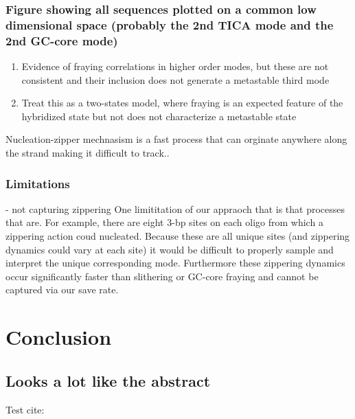 \documentclass[journal=jpcbfk,manuscript=article]{achemso}
\begin{document}
\subsubsection{\label{sec:Results}Figure showing all sequences plotted on a common low dimensional space (probably the 2nd TICA mode and the 2nd GC-core mode)}

\begin{enumerate}
	\item Evidence of fraying correlations in higher order modes, but these are not consistent and their inclusion does not generate a metastable third mode
	\item Treat this as a two-states model, where fraying is an expected feature of the hybridized state but not does not characterize a metastable state
\end{enumerate}

Nucleation-zipper mechnasism is a fast process that can orginate anywhere along the strand making it difficult to track..


\subsubsection{\label{sec:Results}Limitations} 
- not capturing zippering
One limititation of our appraoch that is that processes that are. For example, there are eight 3-bp sites on each oligo from which a zippering action coud nucleated. Because these are all unique sites (and zippering dynamics could vary at each site) it would be difficult to properly sample and interpret the unique corresponding mode. Furthermore these zippering dynamics occur significantly faster than slithering or GC-core fraying and cannot be captured via our save rate.


    
\section{\label{sec:conc}Conclusion}
\subsection{\label{sec:Results}Looks a lot like the abstract}



\clearpage
\newpage

%
Test cite: \citep{Zhang2018DeepMechanics}



\clearpage
\end{document}
